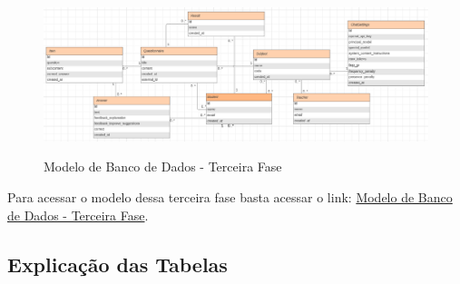 \begin{figure}[H]
    \centering
    \caption{Modelo de Banco de Dados - Terceira Fase}
    \includegraphics[width=1\textwidth]{figuras/bd-phase3.png}
    \label{fig:third_phase}
\end{figure}

Para acessar o modelo dessa terceira fase basta acessar o link: \href{https://lucid.app/lucidchart/c1e592ab-3b4a-4bba-9849-cc3237f4fa76/edit?viewport_loc=-2447%2C-1073%2C2164%2C956%2C0_0&invitationId=inv_fbaaf515-3973-4d6a-9359-eb0dc4a26eee}{Modelo de Banco de Dados - Terceira Fase}.

\subsection{Explicação das Tabelas}

